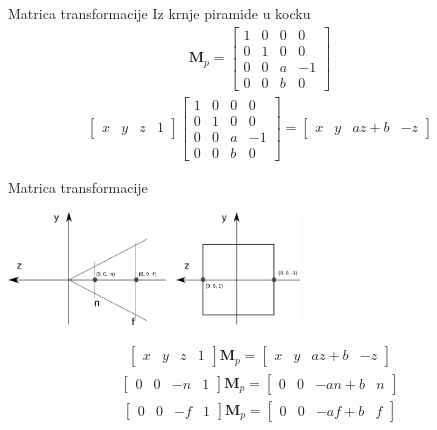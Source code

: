 \documentclass[9pt]{beamer}
\begin{document}
\begin{frame}{Matrica transformacije}
	Iz krnje piramide u kocku
	\begin{align*}
	\mathbf{M}_p = \left[ \begin{array}{cccc}
	1 & 0 & 0 & 0 \\
	0 & 1 & 0 & 0 \\
	0 & 0 & a & -1 \\
	0 & 0 & b & 0 
	\end{array} \right]
	\end{align*}
	\begin{align*}
	\left[ \begin{array}{cccc}x & y & z & 1 \end{array} \right] \left[ \begin{array}{cccc}
	1 & 0 & 0 & 0 \\
	0 & 1 & 0 & 0 \\
	0 & 0 & a & -1 \\
	0 & 0 & b & 0 
	\end{array} \right] = \left[ \begin{array}{cccc}x & y & az+b & -z \end{array} \right]
	\end{align*}
\end{frame}

\begin{frame}{Matrica transformacije}
	\begin{center}
		\includegraphics[height=3cm]{slike/p04_07.png}
	\end{center}
	\begin{align*}
	\left[ \begin{array}{cccc}x & y & z & 1 \end{array} \right] \mathbf{M}_p = \left[ \begin{array}{cccc}x & y & az+b & -z \end{array} \right]
	\end{align*}
	\begin{align*}
	\left[ \begin{array}{cccc}0 & 0 & -n & 1 \end{array} \right]
	\mathbf{M}_p = \left[ \begin{array}{cccc}0 & 0 & -an+b & n \end{array} \right]
	\end{align*}
	\begin{align*}
	\left[ \begin{array}{cccc}0 & 0 & -f & 1 \end{array} \right]
	\mathbf{M}_p = \left[ \begin{array}{cccc}0 & 0 & -af+b & f \end{array} \right]
	\end{align*}
\end{frame}
\end{document}
